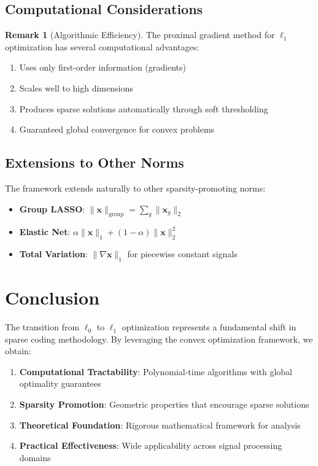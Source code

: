 \documentclass[12pt]{article}
\renewcommand{\vec}[1]{\mathbf{#1}}
\newcommand{\norm}[1]{\lVert#1\rVert}
\theoremstyle{definition}
\newtheorem{remark}[theorem]{Remark}
\begin{document}
\subsection{Computational Considerations}

\begin{remark}[Algorithmic Efficiency]
    The proximal gradient method for $\ell_1$ optimization has several computational advantages:
    \begin{enumerate}
        \item Uses only first-order information (gradients)
        \item Scales well to high dimensions
        \item Produces sparse solutions automatically through soft thresholding
        \item Guaranteed global convergence for convex problems
    \end{enumerate}
\end{remark}

\subsection{Extensions to Other Norms}

The framework extends naturally to other sparsity-promoting norms:

\begin{itemize}
    \item \textbf{Group LASSO}: $\norm{\vec{x}}_{\text{group}} = \sum_g \norm{\vec{x}_g}_2$
    \item \textbf{Elastic Net}: $\alpha \norm{\vec{x}}_1 + (1-\alpha) \norm{\vec{x}}_2^2$
    \item \textbf{Total Variation}: $\norm{\nabla \vec{x}}_1$ for piecewise constant signals
\end{itemize}

\section{Conclusion}

The transition from $\ell_0$ to $\ell_1$ optimization represents a fundamental shift in sparse coding methodology. By leveraging the convex optimization framework, we obtain:

\begin{enumerate}
    \item \textbf{Computational Tractability}: Polynomial-time algorithms with global optimality guarantees
    \item \textbf{Sparsity Promotion}: Geometric properties that encourage sparse solutions
    \item \textbf{Theoretical Foundation}: Rigorous mathematical framework for analysis
    \item \textbf{Practical Effectiveness}: Wide applicability across signal processing domains
\end{enumerate}
\end{document}
